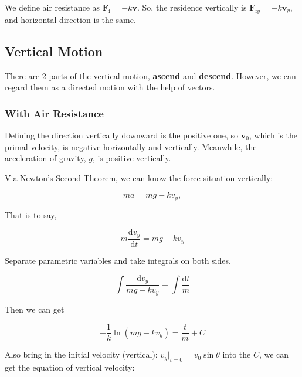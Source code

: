 \documentclass{article}
\begin{document}
We define air resistance as $\boldsymbol{F}_\mathrm{f}=-k\boldsymbol{v}$. So, the residence vertically is $\boldsymbol{F}_{\mathrm{f}y}=-k\boldsymbol{v}_y$, and horizontal direction is the same.

\subsection{Vertical Motion}

\label{subsection:vertical-motion}

There are 2 parts of the vertical motion, \textbf{ascend} and \textbf{descend}. However, we can regard them as a directed motion with the help of vectors.

\subsubsection{With Air Resistance}

\label{subsubsection:vertical-motion-with-residence}

Defining the direction vertically downward is the positive one, so $\boldsymbol{v}_0$, which is the primal velocity, is negative horizontally and vertically. Meanwhile, the acceleration of gravity, $g$, is positive vertically.

Via Newton's Second Theorem, we can know the force situation vertically:

\newcommand{\derive}{\mathrm{d}}

\begin{equation*}
    ma = mg - kv_y,
\end{equation*}

That is to say,

\begin{equation}
    m\dfrac{\derive v_y}{\derive t} = mg - kv_y
\end{equation}

Separate parametric variables and take integrals on both sides.

\begin{equation}
    \int\dfrac{\derive v_y}{mg - kv_y} = \int\dfrac{\derive t}{m}
\end{equation}

Then we can get

\begin{equation}
    -\dfrac{1}{k}\ln\left(mg-kv_y\right)=\dfrac{t}{m}+C
\end{equation}

Also bring in the initial velocity (vertical): $v_y\big\vert_{t=0}=v_0\sin\theta$ into the $C$, we can get the equation of vertical velocity:
\end{document}
